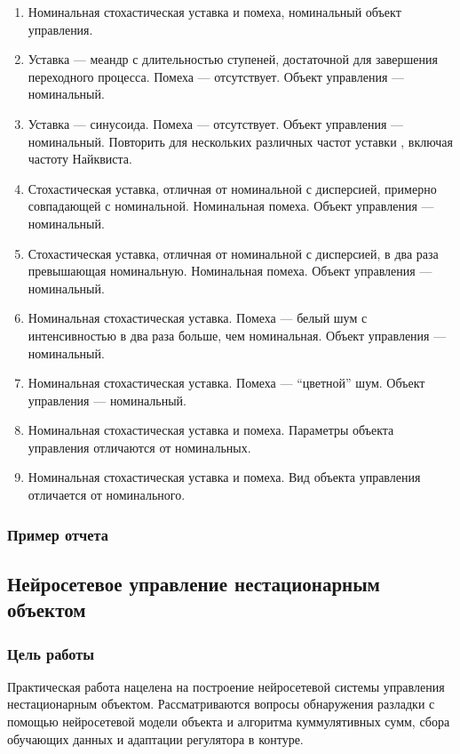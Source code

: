 \begin{enumerate}
\item Номинальная стохастическая уставка и помеха, номинальный объект
  управления.
\item Уставка --- меандр с длительностью ступеней, достаточной для
  завершения переходного процесса.  Помеха --- отсутствует.  Объект
  управления --- номинальный.
\item Уставка --- синусоида.  Помеха --- отсутствует.  Объект
  управления --- номинальный.  Повторить для нескольких различных
  частот уставки , включая частоту Найквиста.
\item Стохастическая уставка, отличная от номинальной с дисперсией,
  примерно совпадающей с номинальной.  Номинальная помеха.  Объект
  управления --- номинальный.
\item Стохастическая уставка, отличная от номинальной с дисперсией, в
  два раза превышающая номинальную.  Номинальная помеха.  Объект
  управления --- номинальный.
\item Номинальная стохастическая уставка.  Помеха --- белый шум с
  интенсивностью в два раза больше, чем номинальная.  Объект
  управления --- номинальный.
\item Номинальная стохастическая уставка.  Помеха --- ``цветной'' шум.
  Объект управления --- номинальный.
\item Номинальная стохастическая уставка и помеха.  Параметры объекта
  управления отличаются от номинальных.
\item Номинальная стохастическая уставка и помеха.  Вид объекта
  управления отличается от номинального.
\end{enumerate}

\subsubsection{Пример отчета}


\subsection{Нейросетевое управление нестационарным объектом}

\subsubsection{Цель работы}

Практическая работа нацелена на построение нейросетевой системы
управления нестационарным объектом.  Рассматриваются вопросы
обнаружения разладки с помощью нейросетевой модели объекта и алгоритма
куммулятивных сумм, сбора обучающих данных и адаптации
регулятора в контуре.

